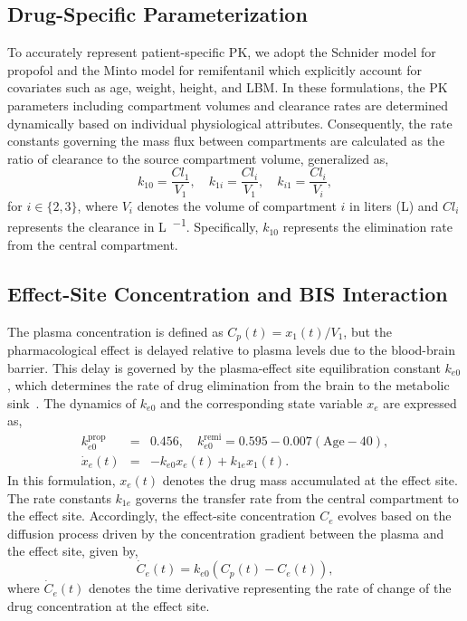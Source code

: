 \documentclass[pdflatex,sn-mathphys-num]{sn-jnl}%
\theoremstyle{thmstyleone}%
\theoremstyle{thmstyletwo}%
\theoremstyle{thmstylethree}%
\begin{document}
\subsection{Drug-Specific Parameterization}
To accurately represent patient-specific PK, we adopt the Schnider model for propofol and the Minto model for remifentanil which explicitly account for covariates such as age, weight, height, and LBM. In these formulations, the PK parameters including compartment volumes and clearance rates are determined dynamically based on individual physiological attributes. Consequently, the rate constants governing the mass flux between compartments are calculated as the ratio of clearance to the source compartment volume, generalized as,
\begin{equation}
    k_{10} = \frac{Cl_{1}}{V_{1}}, \quad
    k_{1i} = \frac{Cl_{i}}{V_{1}}, \quad 
    k_{i1} = \frac{Cl_{i}}{V_{i}},
%     
\end{equation}
    for $i \in \{2,3\}$, 
where $V_{i}$ denotes the volume of compartment $i$ in liters (\si{\liter}) and $Cl_{i}$ represents the clearance in \si{\liter\per\min}. Specifically, $k_{10}$  represents the elimination rate from the central compartment.

\subsection{Effect-Site Concentration and BIS Interaction}
The plasma concentration is defined as $C_p(t) = x_{1}(t)/\textit{V}_{1}$, but the pharmacological effect is delayed relative to plasma levels due to the blood-brain barrier. This delay is governed by the plasma-effect site equilibration constant $k_{e0}$, which determines the rate of drug elimination from the brain to the metabolic sink~\citep{she_79_sim}. The dynamics of $k_{e0}$ and the corresponding state variable $x_e$ are expressed as,
\begin{eqnarray}
    \label{eq:xe}
    k_{e0}^{\text{prop}} &=& 0.456, \quad
    k_{e0}^{\text{remi}} = 0.595 - 0.007(\text{Age} - 40), 
      \\
    \dot{x}_{e}(t) &=& -k_{e0}{x_{e}}(t) + k_{1e}x_{1}(t).
\end{eqnarray} 
In this formulation, $x_e(t)$ denotes the drug mass accumulated at the effect site. The rate constants $k_{1e}$ governs the transfer rate from the central compartment to the effect site.
Accordingly, the effect-site concentration $C_{e}$ evolves based on the diffusion process driven by the concentration gradient between the plasma and the effect site, given by,
\begin{equation}
    \label{eq:ce}
    \dot{C}_{e}(t) = k_{e0}(C_{p}(t) - C_{e}(t)),
\end{equation}
where $\dot{C}_{e}(t)$ denotes the time derivative representing the rate of change of the drug concentration at the effect site.
\end{document}
